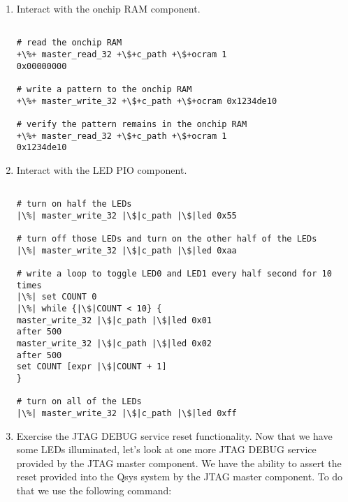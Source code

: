 \begin{flushleft}
\begin{enumerate}[
	label=\textbf{Step \arabic*.},
	leftmargin=*,
	widest={00},
	align=left]
\begin{enumerate}[
	label=\textbf{Step \arabic{enumi}\alph*.},
	leftmargin=*,
	align=left]
\begin{verbatim}
# locate the service path for the JTAG master component
+\%+ set m_path [get_service_paths master]
/devices/5CSEBA6(.|ES)|5CSEMA6|..@2#1-4#DE-SoC/(link)/JTAG/
alt_sld_fab_sldfabric.node_0/phy_0/master_0.master

# claim that service path so we can interact with it
+\%+ set c_path [claim_service master +\$+m_path ""]
/channels/local/(lib)/master_1

\end{verbatim}

\item Interact with the onchip RAM component.

\begin{verbatim}

# read the onchip RAM
+\%+ master_read_32 +\$+c_path +\$+ocram 1
0x00000000

# write a pattern to the onchip RAM
+\%+ master_write_32 +\$+c_path +\$+ocram 0x1234de10

# verify the pattern remains in the onchip RAM
+\%+ master_read_32 +\$+c_path +\$+ocram 1
0x1234de10

\end{verbatim}

\item Interact with the LED PIO component.

\begin{verbatim}

# turn on half the LEDs
|\%| master_write_32 |\$|c_path |\$|led 0x55

# turn off those LEDs and turn on the other half of the LEDs
|\%| master_write_32 |\$|c_path |\$|led 0xaa

# write a loop to toggle LED0 and LED1 every half second for 10 times
|\%| set COUNT 0
|\%| while {|\$|COUNT < 10} {
master_write_32 |\$|c_path |\$|led 0x01
after 500
master_write_32 |\$|c_path |\$|led 0x02
after 500
set COUNT [expr |\$|COUNT + 1]
}

# turn on all of the LEDs
|\%| master_write_32 |\$|c_path |\$|led 0xff

\end{verbatim}

\item Exercise the JTAG DEBUG service reset functionality.  Now that we have some LEDs illuminated, let's look at one more JTAG DEBUG service provided by the JTAG master component.  We have the ability to assert the reset provided into the Qsys system by the JTAG master component. To do that we use the following command:


\end{enumerate}
\end{enumerate}
\end{flushleft}
